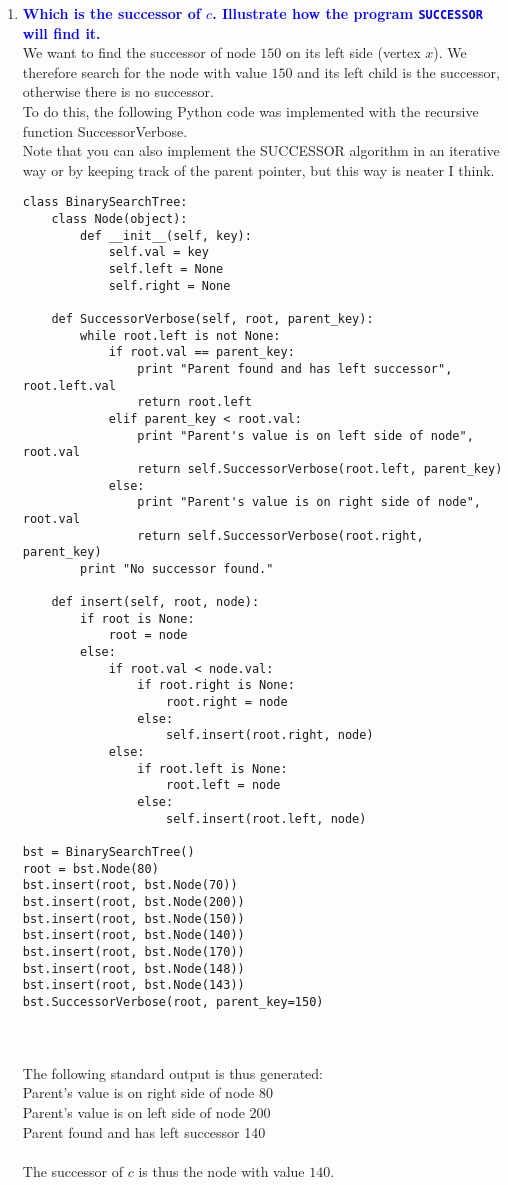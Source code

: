 \documentclass[11pt]{article}
\begin{document}
\begin{enumerate}
    \begin{enumerate}
    \item \textbf{\textcolor{blue}{Which is the successor of $c$.  
    Illustrate how the program {\tt SUCCESSOR} will find it.}}
        \\ We want to find the successor of node $150$ on its left side (vertex $x$). We therefore search 
        for the node with value $150$ and its left child is the successor, otherwise there is no successor.
        \\ To do this, the following Python code was implemented with the recursive function SuccessorVerbose.
        \\ Note that you can also implement the SUCCESSOR algorithm in an iterative way or by keeping track of the parent pointer, but this way is neater I think.
        \begin{verbatim}
class BinarySearchTree:
    class Node(object):
        def __init__(self, key):
            self.val = key
            self.left = None
            self.right = None
            
    def SuccessorVerbose(self, root, parent_key):
        while root.left is not None:
            if root.val == parent_key:
                print "Parent found and has left successor", root.left.val
                return root.left
            elif parent_key < root.val:
                print "Parent's value is on left side of node", root.val
                return self.SuccessorVerbose(root.left, parent_key)
            else:
                print "Parent's value is on right side of node", root.val
                return self.SuccessorVerbose(root.right, parent_key)
        print "No successor found."
        
    def insert(self, root, node):
        if root is None:
            root = node
        else:
            if root.val < node.val:
                if root.right is None:
                    root.right = node
                else:
                    self.insert(root.right, node)
            else:
                if root.left is None:
                    root.left = node
                else:
                    self.insert(root.left, node)
            
bst = BinarySearchTree()
root = bst.Node(80)
bst.insert(root, bst.Node(70))
bst.insert(root, bst.Node(200))
bst.insert(root, bst.Node(150))
bst.insert(root, bst.Node(140))
bst.insert(root, bst.Node(170))
bst.insert(root, bst.Node(148))
bst.insert(root, bst.Node(143))
bst.SuccessorVerbose(root, parent_key=150)
        \end{verbatim}
        \\\\ The following standard output is thus generated:
        \\ Parent's value is on right side of node 80
        \\ Parent's value is on left side of node 200
        \\ Parent found and has left successor 140
        \\\\ The successor of $c$ is thus the node with value $140$.
        

\end{enumerate}
\end{enumerate}
\end{document}
